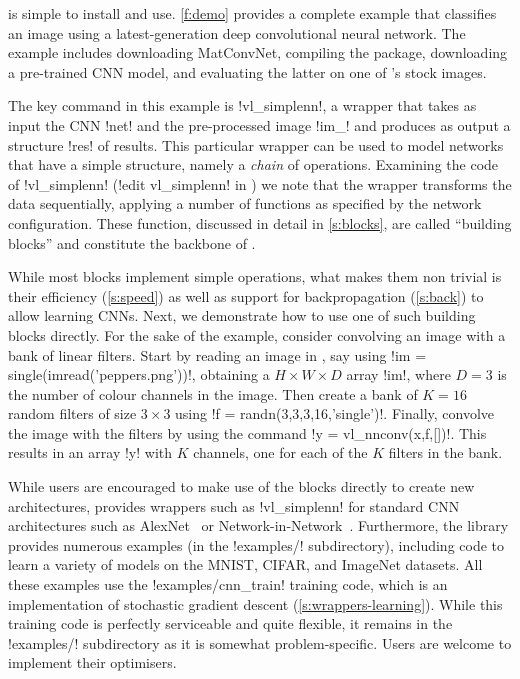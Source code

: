 \matconvnet is simple to install and use. \autoref{f:demo} provides a complete example that classifies an image using a latest-generation deep convolutional neural network. The example includes downloading MatConvNet, compiling the package, downloading a pre-trained CNN model, and evaluating the latter on one of \matlab's stock images.

The key command in this example is !vl_simplenn!, a wrapper that takes as input the CNN !net! and the pre-processed image !im_! and produces as output a structure !res! of results. This particular wrapper can be used to model networks that have a simple structure, namely a \emph{chain} of operations. Examining the code of !vl_simplenn! (!edit vl_simplenn! in \matconvnet) we note that the wrapper transforms the data sequentially, applying a number of \matlab functions as specified by the network configuration. These function, discussed in detail in \autoref{s:blocks}, are called ``building blocks'' and constitute the backbone of \matconvnet. 


While most blocks implement simple operations, what makes them non trivial is their efficiency (\autoref{s:speed}) as well as support for backpropagation (\autoref{s:back}) to allow learning CNNs. Next, we demonstrate how to use one of such building blocks directly. For the sake of the example, consider convolving an image with a bank of linear filters. Start by reading an image in \matlab, say using !im = single(imread('peppers.png'))!, obtaining a $H \times W \times D$ array !im!, where $D=3$ is the number of colour channels in the image. Then create a bank of $K=16$ random filters of size $3 \times 3$ using !f = randn(3,3,3,16,'single')!. Finally, convolve the image with the filters by using the command !y = vl_nnconv(x,f,[])!. This results in an array !y! with $K$ channels, one for each of the $K$ filters in the bank. 

While users are encouraged to make use of the blocks directly to create new architectures, \matlab provides wrappers such as !vl_simplenn! for standard CNN architectures such as AlexNet~\cite{krizhevsky12imagenet} or Network-in-Network~\cite{lin13network}. Furthermore, the library provides numerous examples (in the !examples/! subdirectory), including code to learn a variety of models on the MNIST, CIFAR, and ImageNet datasets. All these examples use the !examples/cnn_train! training code, which is an implementation of stochastic gradient descent (\autoref{s:wrappers-learning}). While this training code is perfectly serviceable and quite flexible, it remains in the !examples/! subdirectory as it is somewhat problem-specific. Users are welcome to implement their optimisers.

